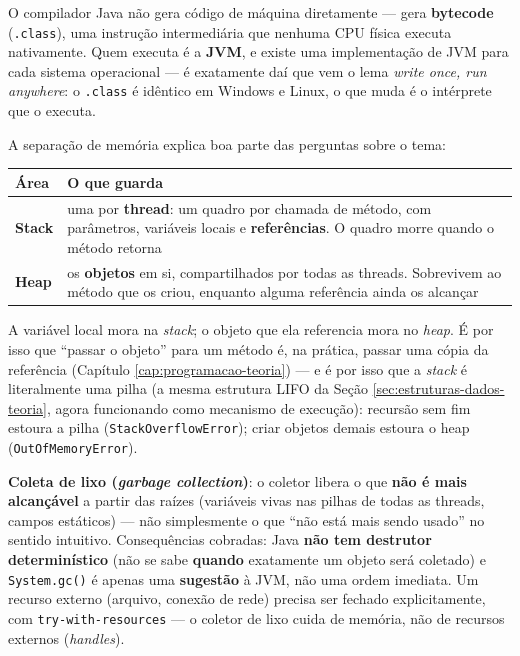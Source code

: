 \begin{conceito}
O compilador Java não gera código de máquina diretamente --- gera
\textbf{bytecode} (\texttt{.class}), uma instrução intermediária que
nenhuma CPU física executa nativamente. Quem executa é a \textbf{JVM}, e
existe uma implementação de JVM para cada sistema operacional --- é
exatamente daí que vem o lema \textit{write once, run anywhere}: o
\texttt{.class} é idêntico em Windows e Linux, o que muda é o intérprete
que o executa.

A separação de memória explica boa parte das perguntas sobre o tema:

\begin{center}
\begin{tabular}{@{}p{2.2cm}p{9.4cm}@{}}
\toprule
\textbf{Área} & \textbf{O que guarda} \\
\midrule
\textbf{Stack} & uma por \textbf{thread}: um quadro por chamada de
método, com parâmetros, variáveis locais e \textbf{referências}. O
quadro morre quando o método retorna \\
\textbf{Heap} & os \textbf{objetos} em si, compartilhados por todas as
threads. Sobrevivem ao método que os criou, enquanto alguma referência
ainda os alcançar \\
\bottomrule
\end{tabular}
\end{center}

A variável local mora na \textit{stack}; o objeto que ela referencia mora
no \textit{heap}. É por isso que “passar o objeto” para um método é, na
prática, passar uma cópia da referência (Capítulo
\ref{cap:programacao-teoria}) --- e é por isso que a \textit{stack} é
literalmente uma pilha (a mesma estrutura LIFO da Seção
\ref{sec:estruturas-dados-teoria}, agora funcionando como mecanismo de
execução): recursão sem fim estoura a pilha
(\texttt{StackOverflowError}); criar objetos demais estoura o heap
(\texttt{OutOfMemoryError}).

\textbf{Coleta de lixo (\textit{garbage collection})}: o coletor libera o
que \textbf{não é mais alcançável} a partir das raízes (variáveis vivas
nas pilhas de todas as threads, campos estáticos) --- não simplesmente o
que “não está mais sendo usado” no sentido intuitivo. Consequências
cobradas: Java \textbf{não tem destrutor determinístico} (não se sabe
\textbf{quando} exatamente um objeto será coletado) e
\texttt{System.gc()} é apenas uma \textbf{sugestão} à JVM, não uma ordem
imediata. Um recurso externo (arquivo, conexão de rede) precisa ser
fechado explicitamente, com \texttt{try-with-resources} --- o coletor de
lixo cuida de memória, não de recursos externos (\textit{handles}).
\end{conceito}


